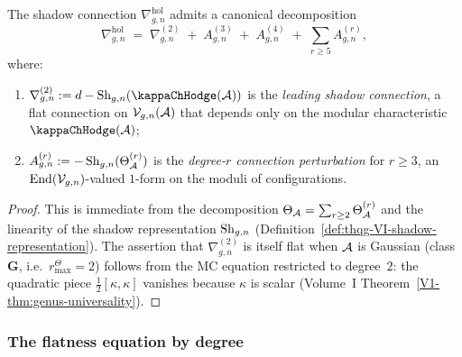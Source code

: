 \begin{proposition}
The shadow connection $\nabla^{\mathrm{hol}}_{g,n}$ admits a canonical
decomposition
\begin{equation}%
\nabla^{\mathrm{hol}}_{g,n}
\;=\;
\nabla^{(2)}_{g,n}
\;+\;
A^{(3)}_{g,n}
\;+\;
A^{(4)}_{g,n}
\;+\;
\sum_{r \geq 5} A^{(r)}_{g,n},
\end{equation}
where:
\begin{enumerate}[label=\textup{(\roman*)}]
\item $\nabla^{(2)}_{g,n} := d - \Sh_{g,n}(\kappaChHodge(\cA))$ is
 the \emph{leading shadow connection}, a flat connection on
 $\mathcal{V}_{g,n}(\mathcal{A})$ that depends only on the modular
 characteristic~$\kappaChHodge(\cA)$;
\item $A^{(r)}_{g,n} := -\operatorname{Sh}_{g,n}(\Theta_{\mathcal{A}}^{(r)})$ is
 the \emph{degree-$r$ connection perturbation} for $r \geq 3$,
 an $\operatorname{End}(\mathcal{V}_{g,n})$-valued $1$-form on the moduli of
 configurations.
\end{enumerate}
\end{proposition}

\begin{proof}
This is immediate from the decomposition
$\Theta_{\mathcal{A}} = \sum_{r \geq 2} \Theta_{\mathcal{A}}^{(r)}$
and the linearity of the shadow representation
$\operatorname{Sh}_{g,n}$ (Definition~\ref{def:thqg-VI-shadow-representation}).
The assertion that $\nabla^{(2)}_{g,n}$ is itself flat when
\(\mathcal{A}\) is Gaussian (class~\(\mathbf{G}\), i.e.\
\(r^\Theta_{\max}=2\)) follows
from the MC equation restricted to degree~$2$: the quadratic piece
$\tfrac{1}{2}[\kappa,\kappa]$ vanishes because $\kappa$ is scalar
(Volume~I Theorem~\ref{V1-thm:genus-universality}).
\end{proof}

\subsubsection{The flatness equation by degree}

